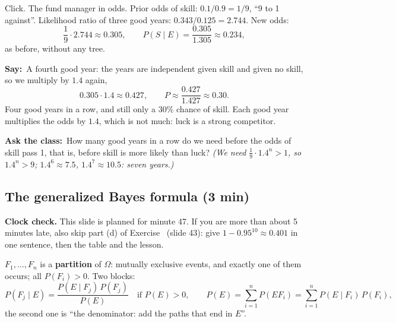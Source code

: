 \documentclass[11pt,a4paper,parskip=half]{scrartcl}
\newcommand{\Om}{\Omega}
\newcommand{\say}{\textbf{\color{teal}Say:}\ }
\newcommand{\ask}{\textbf{\color{navy}Ask the class:}\ }
\begin{document}
Click. The fund manager in odds. Prior odds of skill:
$0.1/0.9=1/9$, ``9 to 1 against''. Likelihood ratio of three good years:
$0.343/0.125=2.744$. New odds:
\[ \frac19\cdot2.744\approx0.305,\qquad
	P(S\mid E)=\frac{0.305}{1.305}\approx0.234, \]
as before, without any tree.

\say A fourth good year: the years are independent given skill and given
no skill, so we multiply by $1.4$ again,
\[ 0.305\cdot1.4\approx0.427,\qquad P\approx\frac{0.427}{1.427}\approx0.30. \]
Four good years in a row, and still only a 30\% chance of skill. Each
good year multiplies the odds by $1.4$, which is not much: luck is a
strong competitor.

\ask How many good years in a row do we need before the odds of skill pass
1, that is, before skill is more likely than luck? \emph{(We need
$\tfrac19\cdot1.4^n>1$, so $1.4^n>9$; $1.4^6\approx7.5$,
$1.4^7\approx10.5$: seven years.)}

\subsection{The generalized Bayes formula (3 min)}

\begin{clockcheck}
	\textbf{Clock check.} This slide is planned for minute 47. If you are
	more than about 5 minutes late, also skip part (d) of
	Exercise~ (slide 43): give
	$1-0.95^{10}\approx0.401$ in one sentence, then the table and the
	lesson.
\end{clockcheck}

\begin{onslide}
	$F_1,\dots,F_n$ is a \textbf{partition} of $\Om$: mutually exclusive
	events, and exactly one of them occurs; all $P(F_i)>0$. Two blocks:
	\[ P(F_j\mid E)=\frac{P(E\mid F_j)\,P(F_j)}{P(E)}\quad\text{if } P(E)>0,\qquad
		P(E)=\sum_{i=1}^n P(EF_i)=\sum_{i=1}^n P(E\mid F_i)\,P(F_i), \]
	the second one is ``the denominator: add the paths that end in $E$''.
\end{onslide}
\end{document}
